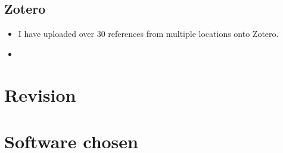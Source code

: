 \documentclass{article}
\begin{document}
\subsection{Zotero}
\begin{itemize}
    \item I have uploaded over 30 references from multiple locations onto Zotero.
    \item 
\end{itemize}

\section{Revision}

\section{Software chosen}
\end{document}
